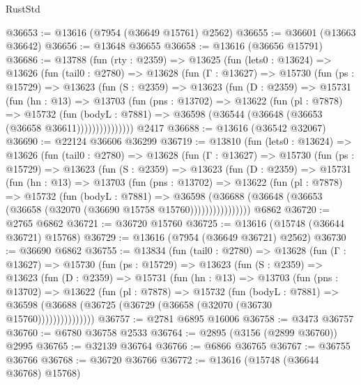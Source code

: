 \begin{lexlean}{RustStd}
\begin{coremodule}
@36653 := @13616 (@7954 (@36649 @15761) @2562)
@36655 := @36601 (@13663 @36642)
@36656 := @13648 @36655
@36658 := @13616 (@36656 @15791)
@36686 := @13788
    (fun (rty : @2359) =>
    @13625
      (fun (lets0 : @13624) =>
      @13626
        (fun (tail0 : @2780) =>
        @13628
          (fun (Γ : @13627) =>
          @15730
            (fun (ps : @15729) =>
            @13623
              (fun (S : @2359) =>
              @13623
                (fun (D : @2359) =>
                @15731
                  (fun (hn : @13) =>
                  @13703
                    (fun (pns : @13702) =>
                    @13622
                      (fun (pl : @7878) =>
                      @15732
                        (fun (bodyL : @7881) =>
                        @36598 (@36544 (@36648 (@36653 (@36658 @36611)))))))))))))))
    @2417
@36688 := @13616 (@36542 @32067)
@36690 := @22124 @36606 @36299
@36719 := @13810
    (fun (lets0 : @13624) =>
    @13626
      (fun (tail0 : @2780) =>
      @13628
        (fun (Γ : @13627) =>
        @15730
          (fun (ps : @15729) =>
          @13623
            (fun (S : @2359) =>
            @13623
              (fun (D : @2359) =>
              @15731
                (fun (hn : @13) =>
                @13703
                  (fun (pns : @13702) =>
                  @13622
                    (fun (pl : @7878) =>
                    @15732
                      (fun (bodyL : @7881) =>
                      @36598
                        (@36688
                          (@36648 (@36653 (@36658 (@32070 (@36690 @15758 @15760))))))))))))))))
    @6862
@36720 := @2765 @6862
@36721 := @36720 @15760
@36725 := @13616 (@15748 (@36644 @36721) @15768)
@36729 := @13616 (@7954 (@36649 @36721) @2562)
@36730 := @36690 @6862
@36755 := @13834
    (fun (tail0 : @2780) =>
    @13628
      (fun (Γ : @13627) =>
      @15730
        (fun (ps : @15729) =>
        @13623
          (fun (S : @2359) =>
          @13623
            (fun (D : @2359) =>
            @15731
              (fun (hn : @13) =>
              @13703
                (fun (pns : @13702) =>
                @13622
                  (fun (pl : @7878) =>
                  @15732
                    (fun (bodyL : @7881) =>
                    @36598 (@36688 (@36725 (@36729 (@36658 (@32070 (@36730 @15760)))))))))))))))
@36757 := @2781 @6895 @16006
@36758 := @3473 @36757
@36760 := @6780 @36758 @2533
@36764 := @2895 (@3156 (@2899 @36760)) @2995
@36765 := @32139 @36764
@36766 := @6866 @36765
@36767 := @36755 @36766
@36768 := @36720 @36766
@36772 := @13616 (@15748 (@36644 @36768) @15768)

\end{coremodule}
\end{lexlean}
